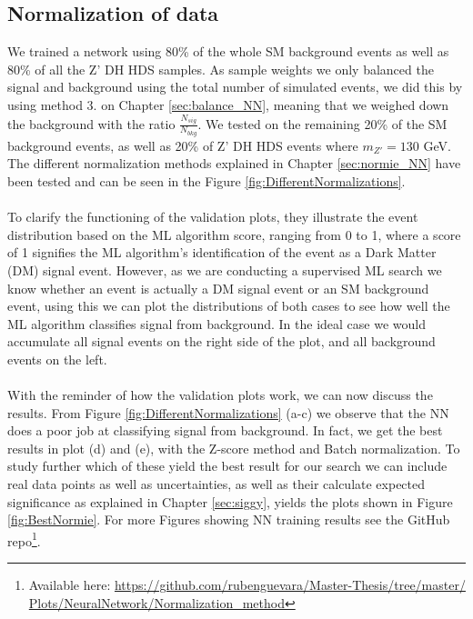 \documentclass[12pt, a4paper]{book}
\begin{document}
\subsection{Normalization of data}\label{sec:normie_NN_res}
We trained a network using 80\% of the whole SM background events as well as 80\% of all the Z' DH HDS samples. As sample weights we only balanced the signal and background using the total number of simulated events, we did this by using method 3. on Chapter \ref{sec:balance_NN}, meaning that we weighed down the background with the ratio $\frac{N_{sig}}{N_{bkg}}$. 
We tested on the remaining 20\% of the SM background events, as well as 20\% of Z' DH HDS events where $m_{Z'} =130$ GeV. The different normalization methods explained in Chapter \ref{sec:normie_NN} have been tested and can be seen in the Figure \ref{fig:DifferentNormalizations}. \\
\\To clarify the functioning of the validation plots, they illustrate the event distribution based on the ML algorithm score, ranging from 0 to 1, where a score of 1 signifies the ML algorithm's identification of the event as a Dark Matter (DM) signal event.
However, as we are conducting a supervised ML search we know whether an event is actually a DM signal event or an SM background event, using this we can plot the distributions of both cases to see how well the ML algorithm classifies signal from background. In the ideal case we would accumulate 
all signal events on the right side of the plot, and all background events on the left.\\
\\With the reminder of how the validation plots work, we can now discuss the results. From Figure \ref{fig:DifferentNormalizations} (a-c) we observe that the NN does a poor job at classifying signal from background. 
In fact, we get the best results in plot (d) and (e), with the Z-score method and Batch normalization. To study further which of these yield the best result for our search we can include real data points as well as uncertainties, 
as well as their calculate expected significance as explained in Chapter \ref{sec:siggy}, yields the plots shown in Figure \ref{fig:BestNormie}. For more Figures showing NN training results see the GitHub 
repo\footnote{Available here: \href{https://github.com/rubenguevara/Master-Thesis/tree/master/Plots/NeuralNetwork/Normalization_method}{https://github.com/rubenguevara/Master-Thesis/tree/master/\\Plots/NeuralNetwork/Normalization\_method}}. 
\end{document}

